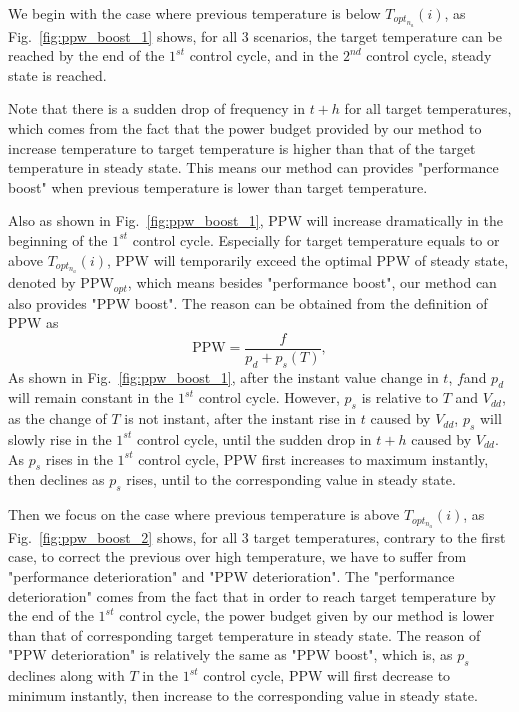 We begin with the case where previous temperature is below $T_{opt_{n_{a}}}(i)$, as Fig.~\ref{fig:ppw_boost_1} shows, for all $3$ scenarios, the target temperature can be reached by the end of the $1^{st}$ control cycle, and in the $2^{nd}$ control cycle, steady state is reached.

Note that there is a sudden drop of frequency in $t+h$ for all target temperatures, which comes from the fact that the power budget provided by our method to increase temperature to target temperature is higher than that of the target temperature in steady state. This means our method can provides "performance boost" when previous temperature is lower than target temperature.

Also as shown in Fig.~\ref{fig:ppw_boost_1}, PPW will increase dramatically in the beginning of the $1^{st}$ control cycle. Especially for target temperature equals to or above $T_{opt_{n_{a}}}(i)$, PPW will temporarily exceed the optimal PPW of steady state, denoted by $\text{PPW}_{opt}$, which means besides "performance boost", our method can also provides "PPW boost". The reason can be obtained from the definition of PPW as
\begin{equation}\label{eq:ppw_detail}
\text{PPW} = \frac{f }{p_{d}+p_{s}(T)},
\end{equation}
As shown in Fig.~\ref{fig:ppw_boost_1}, after the instant value change in $t$, $f$and $p_{d}$ will remain constant in the $1^{st}$ control cycle. However, $p_{s}$ is relative to $T$ and $V_{dd}$, as the change of $T$ is not instant, after the instant rise in $t$ caused by $V_{dd}$, $p_{s}$ will slowly rise in the $1^{st}$ control cycle, until the sudden drop in $t+h$ caused by $V_{dd}$. As $p_{s}$ rises in the $1^{st}$ control cycle, PPW first increases to maximum instantly, then declines as $p_{s}$ rises, until to the corresponding value in steady state.

Then we focus on the case where previous temperature is above $T_{opt_{n_{a}}}(i)$, as Fig.~\ref{fig:ppw_boost_2} shows, for all $3$ target temperatures, contrary to the first case, to correct the previous over high temperature, we have to suffer from "performance deterioration" and "PPW deterioration". The "performance deterioration" comes from the fact that in order to reach target temperature by the end of the $1^{st}$ control cycle, the power budget given by our method is lower than that of corresponding target temperature in steady state. The reason of "PPW deterioration" is relatively the same as "PPW boost", which is, as $p_{s}$declines along with $T$ in the $1^{st}$ control cycle, PPW will first decrease to minimum instantly, then increase to the corresponding value in steady state.


